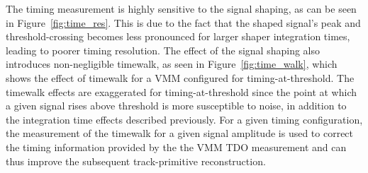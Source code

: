 The timing measurement is highly sensitive to the signal shaping, as can be seen in Figure~\ref{fig:time_res}.
This is due to the fact that the shaped signal's peak and threshold-crossing becomes less pronounced for larger
shaper integration times, leading to poorer timing resolution.
The effect of the signal shaping also introduces non-negligible timewalk, as seen in Figure~\ref{fig:time_walk},
which shows the effect of timewalk for a VMM configured for timing-at-threshold.
The timewalk effects are exaggerated for timing-at-threshold since the point at which a
given signal rises above threshold is more susceptible to noise, in addition to the integration
time effects described previously.
For a given timing configuration, the measurement of the timewalk for a given signal amplitude
is used to correct the timing information provided by the the VMM TDO measurement and can thus
improve the subsequent track-primitive reconstruction.

